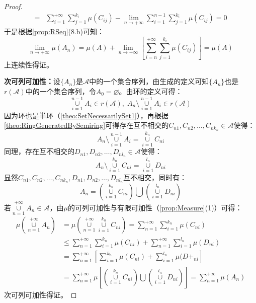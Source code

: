 \begin{proof}
\begin{align*}
		=&\sum_{i=1}^{+\infty}\sum_{j=1}^{k_i}\mu(C_{ij})-\lim_{n\to+\infty}\sum_{i=1}^{n-1}\sum_{j=1}^{k_i}\mu(C_{ij})=0
	\end{align*}
	于是根据\cref{prop:RSeq}(8.b)可知：
	\begin{equation*}
		\lim_{n\to+\infty}\mu(A_n)=\mu(A)+\lim_{n\to+\infty}\left[\sum_{i=n}^{+\infty}\sum_{j=1}^{k_i}\mu(C_{ij})\right]=\mu(A)
	\end{equation*}
	上连续性得证。\par
	\textbf{次可列可加性：}设$\{A_n\}$是$\mathscr{A}$中的一个集合序列，由生成的定义可知$\{A_n\}$也是$r(\mathscr{A})$中的一个集合序列，令$A_0=\varnothing$。由环的定义可得：
	\begin{equation*}
		\underset{i=1}{\overset{n-1}{\cup}}A_i\in r(\mathscr{A}),\;A_n\setminus\underset{i=1}{\overset{n-1}{\cup}}A_i\in r(\mathscr{A})
	\end{equation*}
	因为环也是半环（\cref{theo:SetNecessarilySet1}），再根据\cref{theo:RingGeneratedBySemiring}可得存在互不相交的$C_{n1},C_{n2},\dots,C_{nk_n}\in\mathscr{A}$使得：
	\begin{equation*}
		A_n\setminus\underset{i=1}{\overset{n-1}{\cup}}A_i=\underset{i=1}{\overset{k_n}{\cup}}C_{ni}
	\end{equation*}
	同理，存在互不相交的$D_{n1},D_{n2},\dots,D_{nl_n}\in\mathscr{A}$使得：
	\begin{equation*}
		A_n\setminus\underset{i=1}{\overset{k_n}{\cup}}C_{ni}=\underset{i=1}{\overset{l_n}{\cup}}D_{ni}
	\end{equation*}
	显然$C_{n1},C_{n2},\dots,C_{nk_n},D_{n1},D_{n2},\dots,D_{nl_n}$互不相交，同时有：
	\begin{equation*}
		A_n=\left(\underset{i=1}{\overset{k_n}{\cup}}C_{ni}\right)\bigcup\left(\underset{i=1}{\overset{l_n}{\cup}}D_{ni}\right)
	\end{equation*}
	若$\underset{n=1}{\overset{+\infty}{\cup}}A_n\in\mathscr{A}$，由$\mu$的可列可加性与有限可加性（\cref{prop:Measure}(1)）可得：
	\begin{align*}
		\mu\left(\underset{n=1}{\overset{+\infty}{\cup}}A_n\right)
		&=\mu\left(\underset{n=1}{\overset{+\infty}{\cup}}\underset{i=1}{\overset{k_n}{\cup}}C_{ni}\right) =\sum_{n=1}^{+\infty}\sum_{i=1}^{k_n}\mu(C_{ni}) \\
		&\leqslant\sum_{n=1}^{+\infty}\sum_{i=1}^{k_n}\mu(C_{ni})+\sum_{n=1}^{+\infty}\sum_{i=1}^{l_n}\mu(D_{ni}) \\
		&=\sum_{n=1}^{+\infty}\left[\sum_{i=1}^{k_n}\mu(C_{ni})+\sum_{i=1}^{l_n}\mu(D+_{ni}\right] \\
		&=\sum_{n=1}^{+\infty}\mu\left[\left(\underset{i=1}{\overset{k_n}{\cup}}C_{ni}\right)\bigcup\left(\underset{i=1}{\overset{l_n}{\cup}}D_{ni}\right)\right]=\sum_{n=1}^{+\infty}\mu(A_n)
	\end{align*}
	次可列可加性得证。
\end{proof}
